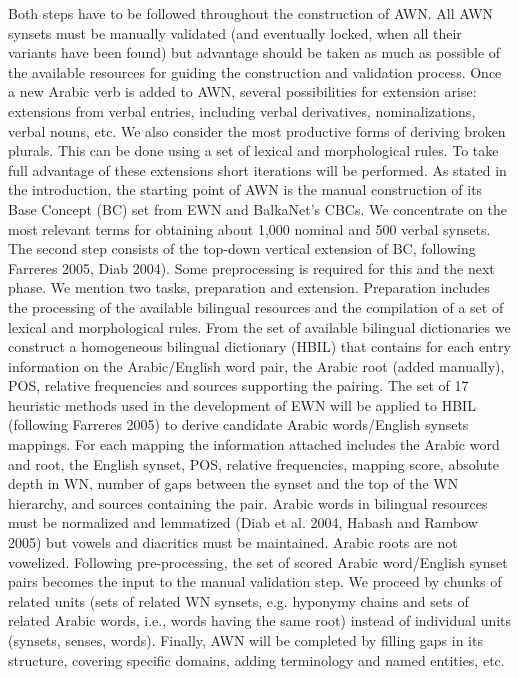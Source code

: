 Both steps have to be followed throughout the construction of AWN. All AWN synsets must be manually validated (and eventually locked, when all their variants have been found) but advantage should be taken as much as possible of the available resources for guiding the construction and validation process. Once a new Arabic verb is added to AWN, several possibilities for extension arise: extensions from verbal entries, including verbal derivatives, nominalizations, verbal nouns, etc. We also consider the most productive forms of deriving broken plurals. This can be done using a set of lexical and morphological rules. To take full advantage of these extensions short iterations will be performed. As stated in the introduction, the starting point of AWN is the manual construction of its Base Concept (BC) set from EWN and BalkaNet's CBCs. We concentrate on the most relevant terms for obtaining about 1,000 nominal and 500 verbal synsets. 
The second step consists of the top-down vertical extension of BC, following Farreres 2005, Diab 2004). Some preprocessing is required for this and the next phase. We mention two tasks, preparation and extension. Preparation includes the processing of the available bilingual resources and the compilation of a set of lexical and morphological rules. From the set of available bilingual dictionaries we construct a homogeneous bilingual dictionary (HBIL) that contains for each entry information on the Arabic/English word pair, the Arabic root (added manually), POS, relative frequencies and sources supporting the pairing.
The set of 17 heuristic methods used in the development of EWN will be applied to HBIL (following Farreres 2005) to derive candidate Arabic words/English synsets mappings. For each mapping the information attached includes the Arabic word and root, the English synset, POS, relative frequencies, mapping score, absolute depth in WN, number of gaps between the synset and the top of the WN hierarchy, and sources containing the pair.
Arabic words in bilingual resources must be normalized and lemmatized (Diab et al. 2004, Habash and Rambow 2005) but vowels and diacritics must be maintained. Arabic roots are not vowelized.
Following pre-processing, the set of scored Arabic word/English synset pairs becomes the input to the manual validation step. We proceed by chunks of related units (sets of related WN synsets, e.g. hyponymy chains and sets of related Arabic words, i.e., words having the same root) instead of individual units (synsets, senses, words).
Finally, AWN will be completed by filling gaps in its structure, covering specific domains, adding terminology and named entities, etc.


